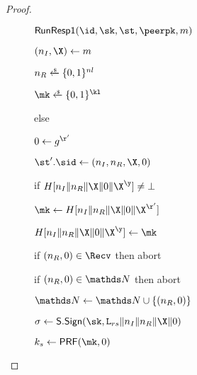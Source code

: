 \begin{proof}
\begin{figure}[tp]
{\begin{minipage}[t]{0.49\textwidth}
    \end{minipage}
    \begin{minipage}[t]{0.49\textwidth}
      \begin{oracle}{$\RunRespI(\id,\sk,\st,\peerpk,m)$}
        \item $(\nonce_I,\X) \gets m$
        \item $\nonce_R \sample \bits^{\nl}$
        \item {}
        \item $\mk\sample \bits^{\kl}$
        \item {}
        \item \hindent \gamechange{$\r \gets \Sent[m]$}
        \item \hindent {}
        \item \hindent {}
        \item \hindent {}
        \item \hindent \hindent {}
        \item \hindent \hindent \hindent {}
        \item \hindent {}
		\label{line:SIGMA-proof:game:advB1:initiator-remember-Q-mk}
        \item else 
        \item \hindent $\Y \gets g^{\r'}$
        \item \hindent $\st'.\sid \gets (\nonce_I, \nonce_R,\X,\Y)$
        \item \hindent if $H[\nonce_I\|\nonce_R\|\X\|\Y\|\X^\y]\neq \bot$
        \item \hindent \hindent$\mk \gets H[\nonce_I\|\nonce_R\|\X\|\Y\|\X^{\r'}]$
        \item \hindent $H[\nonce_I\|\nonce_R\|\X\|\Y\|\X^\y] \gets \mk$
        \item if $(\nonce_R, \Y) \in \Recv$ then abort
        \item if $(\nonce_R, \Y) \in \N$ then abort
        \item $\N \gets \N \cup \{(\nonce_R,\Y)\}$
        \item $\sigma \gets \SIGScheme.\SIGSign(\sk,\labelrs\|\nonce_I\|\nonce_R\|\X\|\Y)$
        \item $\ks \gets \PRF(\mk,0)$

\end{oracle}
\end{minipage}}
\end{figure}
\end{proof}
